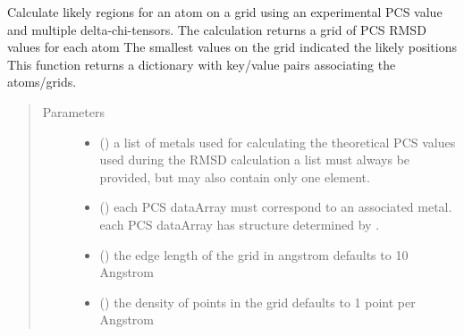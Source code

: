 \documentclass[a4paper,10pt,english,openany,oneside]{sphinxmanual}
\begin{document}
\begin{fulllineitems}
\label{\detokenize{reference/generated/paramagpy.fit.gridsearch_fit_atom_from_pcs:paramagpy.fit.gridsearch_fit_atom_from_pcs}}
Calculate likely regions for an atom on a grid using
an experimental PCS value and multiple delta-chi-tensors.
The calculation returns a grid of PCS RMSD values for each atom
The smallest values on the grid indicated the likely positions
This function returns a dictionary with key/value pairs
associating the atoms/grids.
\begin{quote}\begin{description}
\item[{Parameters}] \leavevmode\begin{itemize}
\item {} 
 () \textendash{} a list of metals used for calculating the theoretical
PCS values used during the RMSD calculation
a list must always be provided, but may also contain
only one element.

\item {} 
 () \textendash{} each PCS dataArray must correspond to an associated metal.
each PCS dataArray has structure determined by
{\hyperref[\detokenize{reference/generated/paramagpy.protein.CustomStructure.parse:paramagpy.protein.CustomStructure.parse}]{}}.

\item {} 
 (\sphinxstyleliteralemphasis{\sphinxupquote{, }}) \textendash{} the edge length of the grid in angstrom
defaults to 10 Angstrom

\item {} 
 (\sphinxstyleliteralemphasis{\sphinxupquote{, }}) \textendash{} the density of points in the grid
defaults to 1 point per Angstrom


\end{itemize}
\end{description}
\end{quote}
\end{fulllineitems}
\end{document}
